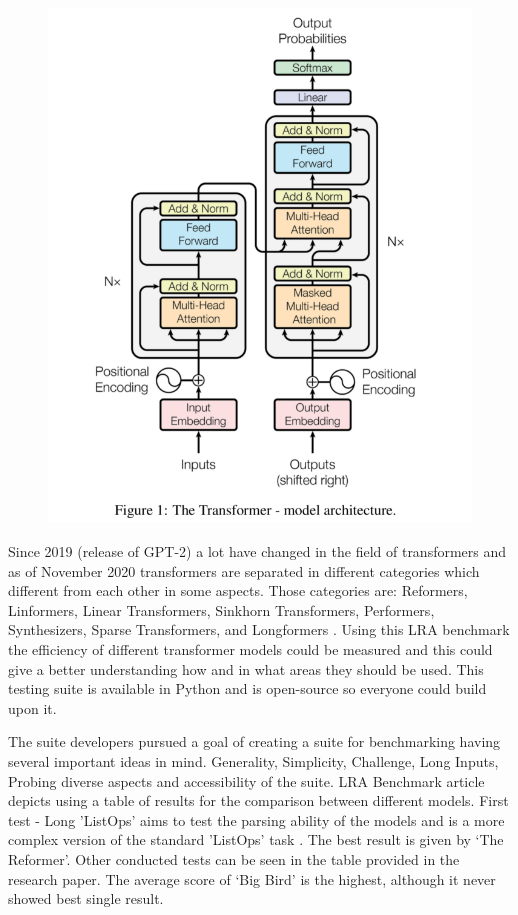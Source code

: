 \documentclass[12pt]{report}
\begin{document}
    \begin{figure}[h]
        \centerline{\includegraphics[scale=.35]{img/transformer_model.png}}
        \label{transformer_model}
    \end{figure}

    Since 2019 (release of GPT-2) a lot have changed in the field of transformers and as of November 2020 transformers are separated in different categories which different from each other in some aspects.
    Those categories are: Reformers, Linformers, Linear Transformers, Sinkhorn Transformers, Performers, Synthesizers, Sparse Transformers, and Longformers \citep{LRA_benchmark}. Using this LRA benchmark the
    efficiency of different transformer models could be measured and this could give a better understanding how and in what areas they should be used. This testing suite is available in Python and is open-source so
    everyone could build upon it.

    The suite developers pursued a goal of creating a suite for benchmarking having several important ideas in mind. Generality, Simplicity, Challenge, Long Inputs, Probing diverse aspects and accessibility of the suite.
    LRA Benchmark article depicts using a table of results for the comparison between different models. First test - Long 'ListOps' aims to test the parsing ability of the models and is a more complex version of the standard 'ListOps' task \citep{ListOps}.
    The best result is given by `The Reformer'. Other conducted tests can be seen in the table provided in the research paper. The average score of `Big Bird' is the highest, although it never showed best single result.
\end{document}
